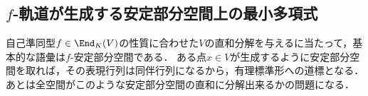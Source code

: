 \documentclass[uplatex, dvipdfmx]{jsreport}
\begin{document}
\subsection{$f$-軌道が生成する安定部分空間上の最小多項式}

\begin{tcolorbox}[colframe=ForestGreen, colback=ForestGreen!10!white,breakable,colbacktitle=ForestGreen!40!white,coltitle=black,fonttitle=\bfseries\sffamily,
title=]
    自己準同型$f\in\End_K(V)$の性質に合わせた$V$の直和分解を与えるに当たって，基本的な語彙は$f$-安定部分空間である．
    ある点$x\in V$が生成するように安定部分空間を取れば，その表現行列は同伴行列になるから，有理標準形への道標となる．
    あとは全空間がこのような安定部分空間の直和に分解出来るかの問題になる．
\end{tcolorbox}
\end{document}
